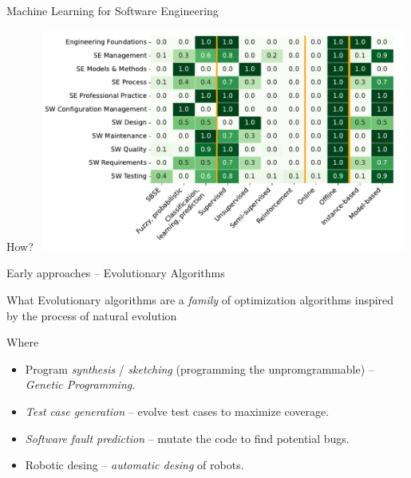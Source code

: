 \documentclass[presentation, 10pt]{beamer}\mode<presentation>{\usetheme{AMSBolognaFC}}
\begin{document}
\begin{frame}{Machine Learning for Software Engineering}
\begin{exampleblock}{How?~\cite{DBLP:journals/csur/KottiGS23}}
\centering
\includegraphics[width=0.9\textwidth]{img/distrubution.png}
\end{exampleblock}
\end{frame}
\begin{frame}{Early approaches -- Evolutionary Algorithms}
\begin{exampleblock}{What}
	Evolutionary algorithms are a \emph{family} of optimization algorithms inspired by the process of natural evolution
\end{exampleblock}
\begin{exampleblock}{Where}
	\begin{itemize}
		\item Program \emph{synthesis} / \emph{sketching} (programming the unpromgrammable) -- \emph{Genetic Programming}.
	
		\item \emph{Test case generation} -- evolve test cases to maximize coverage.
		\item \emph{Software fault prediction} -- mutate the code to find potential bugs.
		\item Robotic desing -- \emph{automatic desing} of robots. 
	\end{itemize}
\end{exampleblock}
\end{frame}
\end{document}
